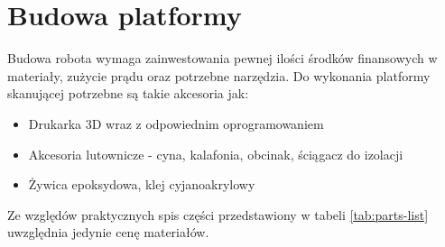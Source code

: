 \section{Budowa platformy}
Budowa robota wymaga zainwestowania pewnej ilości środków finansowych w materiały, zużycie prądu oraz potrzebne narzędzia. Do wykonania platformy skanującej potrzebne są takie akcesoria jak:
\begin{itemize}
    \item Drukarka 3D wraz z odpowiednim oprogramowaniem
    \item Akcesoria lutownicze - cyna, kalafonia, obcinak, ściągacz do izolacji
    \item Żywica epoksydowa, klej cyjanoakrylowy
\end{itemize}

Ze względów praktycznych spis części przedstawiony w tabeli \ref{tab:parts-list} uwzględnia jedynie cenę materiałów. 

